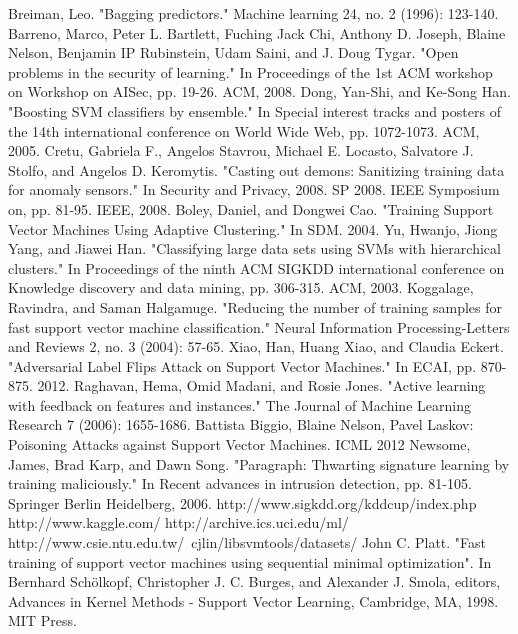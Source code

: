 \documentclass[10pt,conference,compsocconf,letterpaper]{IEEEtran}
\begin{document}
\begin{thebibliography}{9}
Breiman, Leo. "Bagging predictors." Machine learning 24, no. 2 (1996): 123-140.
Barreno, Marco, Peter L. Bartlett, Fuching Jack Chi, Anthony D. Joseph, Blaine Nelson, Benjamin IP Rubinstein, Udam Saini, and J. Doug Tygar. "Open problems in the security of learning." In Proceedings of the 1st ACM workshop on Workshop on AISec, pp. 19-26. ACM, 2008.
Dong, Yan-Shi, and Ke-Song Han. "Boosting SVM classifiers by ensemble." In Special interest tracks and posters of the 14th international conference on World Wide Web, pp. 1072-1073. ACM, 2005.
Cretu, Gabriela F., Angelos Stavrou, Michael E. Locasto, Salvatore J. Stolfo, and Angelos D. Keromytis. "Casting out demons: Sanitizing training data for anomaly sensors." In Security and Privacy, 2008. SP 2008. IEEE Symposium on, pp. 81-95. IEEE, 2008.
Boley, Daniel, and Dongwei Cao. "Training Support Vector Machines Using Adaptive Clustering." In SDM. 2004.
Yu, Hwanjo, Jiong Yang, and Jiawei Han. "Classifying large data sets using SVMs with hierarchical clusters." In Proceedings of the ninth ACM SIGKDD international conference on Knowledge discovery and data mining, pp. 306-315. ACM, 2003.
Koggalage, Ravindra, and Saman Halgamuge. "Reducing the number of training samples for fast support vector machine classification." Neural Information Processing-Letters and Reviews 2, no. 3 (2004): 57-65.
Xiao, Han, Huang Xiao, and Claudia Eckert. "Adversarial Label Flips Attack on Support Vector Machines." In ECAI, pp. 870-875. 2012.
Raghavan, Hema, Omid Madani, and Rosie Jones. "Active learning with feedback on features and instances." The Journal of Machine Learning Research 7 (2006): 1655-1686.
Battista Biggio, Blaine Nelson, Pavel Laskov: Poisoning Attacks against Support Vector Machines. ICML 2012
Newsome, James, Brad Karp, and Dawn Song. "Paragraph: Thwarting signature learning by training maliciously." In Recent advances in intrusion detection, pp. 81-105. Springer Berlin Heidelberg, 2006.
http://www.sigkdd.org/kddcup/index.php
http://www.kaggle.com/
http://archive.ics.uci.edu/ml/
http://www.csie.ntu.edu.tw/~cjlin/libsvmtools/datasets/
John C. Platt. "Fast training of support vector machines using sequential minimal optimization". In Bernhard Schölkopf, Christopher J. C. Burges, and Alexander J. Smola, editors, Advances in Kernel Methods - Support Vector Learning, Cambridge, MA, 1998. MIT Press.
\end{thebibliography}
\end{document}
